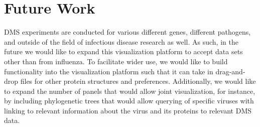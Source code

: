 \documentclass[sigchi, nonacm]{acmart}
\begin{document}
\section{Future Work}

DMS experiments are conducted for various different genes, different pathogens, and outside of the field of infectious disease research as well.
As such, in the future we would like to expand this visualization platform to accept data sets other than from influenza.
To facilitate wider use, we would like to build functionality into the visualization platform such that it can take in drag-and-drop files for other protein structures and preferences.
Additionally, we would like to expand the number of panels that would allow joint visualization, for instance, by including phylogenetic trees that would allow querying of specific viruses with linking to relevant information about the virus and its proteins to relevant DMS data.



\end{document}
